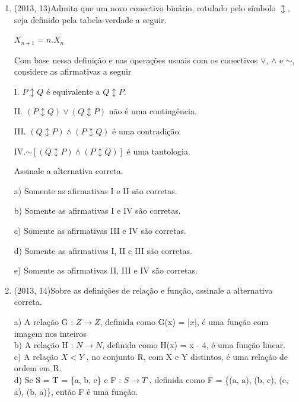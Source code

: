 \documentclass{article}
\begin{document}
\begin{enumerate}
\item(2013, 13)Admita que um novo conectivo binário, rotulado pelo símbolo $\updownarrow$, seja definido pela tabela-verdade a seguir.

\hspace{50} $X_{n+1} = n . X_n$\newline

Com base nessa definição e nas operações usuais com os conectivos $\lor$, $\land $ e $\sim$, considere as afirmativas a seguir \newline

I. $P \updownarrow Q$ é equivalente a $Q \updownarrow P$.

II. $(P \updownarrow Q) \lor (Q \updownarrow P)$ não é uma contingência.

III. $(Q \updownarrow P) \land  (P \updownarrow Q)$ é uma contradição.

IV.$ \sim [(Q \updownarrow P) \land  (P \updownarrow Q)]$ é uma tautologia.\newline

Assinale a alternativa correta.\newline

a) Somente as afirmativas I e II são corretas.

b) Somente as afirmativas I e IV são corretas.

c) Somente as afirmativas III e IV são corretas.

d) Somente as afirmativas I, II e III são corretas.

e) Somente as afirmativas II, III e IV são corretas.\newline





\item(2013, 14)Sobre as definições de relação e função, assinale a alternativa correta.\newline

a) A relação G : $Z \rightarrow Z$, definida como G(x) = $|x|$, é uma função com imagem nos inteiros \\

b) A relação H : $N  \rightarrow N$, definida como H(x) = x - 4, é uma função linear.\\

c) A relação $X < Y$ , no conjunto R, com X e Y distintos, é uma relação de ordem em R.\\

d) Se S = T = \{a, b, c\} e F : $S  \rightarrow T$ , definida como F = \{(a, a), (b, c), (c, a), (b, a)\}, então F é uma função.\\


\end{enumerate}
\end{document}

